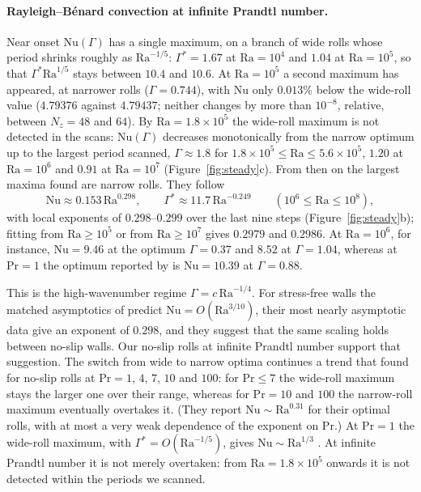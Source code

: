 \paragraph{Rayleigh--B\'enard convection at infinite Prandtl number.} Near onset $\mathrm{Nu}(\Gamma)$ has a
single maximum, on a branch of wide rolls whose period shrinks roughly as $\mathrm{Ra}^{-1/5}$: $\Gamma^*=1.67$ at
$\mathrm{Ra}=10^4$ and $1.04$ at $\mathrm{Ra}=10^5$, so that $\Gamma^*\mathrm{Ra}^{1/5}$ stays between $10.4$ and
$10.6$. At $\mathrm{Ra}=10^5$ a second maximum has appeared, at narrower rolls ($\Gamma=0.744$), with Nu only
$0.013\%$ below the wide-roll value ($4.79376$ against $4.79437$; neither changes by more than $10^{-8}$,
relative, between $N_z=48$ and $64$). By $\mathrm{Ra}=1.8\times10^5$ the wide-roll maximum is not detected in the scans: $\mathrm{Nu}(\Gamma)$
decreases monotonically from the narrow optimum up to the largest period scanned, $\Gamma\approx1.8$ for
$1.8\times10^5\le\mathrm{Ra}\le5.6\times10^5$, $1.20$ at $\mathrm{Ra}=10^6$ and $0.91$ at $\mathrm{Ra}=10^7$
(Figure~\ref{fig:steady}c). From then on the largest maxima found are narrow rolls. They follow
\[
\mathrm{Nu}\approx0.153\,\mathrm{Ra}^{0.298},\qquad \Gamma^*\approx11.7\,\mathrm{Ra}^{-0.249}
\qquad(10^6\le\mathrm{Ra}\le10^8),
\]
with local exponents of $0.298$--$0.299$ over the last nine steps (Figure~\ref{fig:steady}b); fitting from
$\mathrm{Ra}\ge10^5$ or from $\mathrm{Ra}\ge10^7$ gives $0.2979$ and $0.2986$. At
$\mathrm{Ra}=10^6$, for instance, $\mathrm{Nu}=9.46$ at the optimum $\Gamma=0.37$ and $8.52$ at $\Gamma=1.04$,
whereas at $\mathrm{Pr}=1$ the optimum reported by \citet{WenGoluskinDoering2022} is $\mathrm{Nu}=10.39$ at
$\Gamma=0.88$.

This is the high-wavenumber regime $\Gamma=c\,\mathrm{Ra}^{-1/4}$. For stress-free walls the matched asymptotics
of \citet{WenEtAl2026} predict $\mathrm{Nu}=O(\mathrm{Ra}^{3/10})$, their most nearly asymptotic data give an
exponent of $0.298$, and they suggest that the same scaling holds between no-slip walls. Our no-slip rolls at
infinite Prandtl number support that suggestion. The switch from wide to narrow optima continues a trend that
\citet{SondakSmithWaleffe2015} found for no-slip rolls at $\mathrm{Pr}=1$, $4$, $7$, $10$ and $100$: for
$\mathrm{Pr}\le7$ the wide-roll maximum stays the larger one over their range, whereas for $\mathrm{Pr}=10$ and
$100$ the narrow-roll maximum eventually overtakes it. (They report $\mathrm{Nu}\sim\mathrm{Ra}^{0.31}$ for their optimal rolls, with
at most a very weak dependence of the exponent on Pr.) At $\mathrm{Pr}=1$ the wide-roll maximum, with $\Gamma^*=O(\mathrm{Ra}^{-1/5})$, gives
$\mathrm{Nu}\sim\mathrm{Ra}^{1/3}$ \citep{WenGoluskinDoering2022}. At infinite Prandtl number it is not merely
overtaken: from $\mathrm{Ra}=1.8\times10^5$ onwards it is not detected within the periods we scanned.

